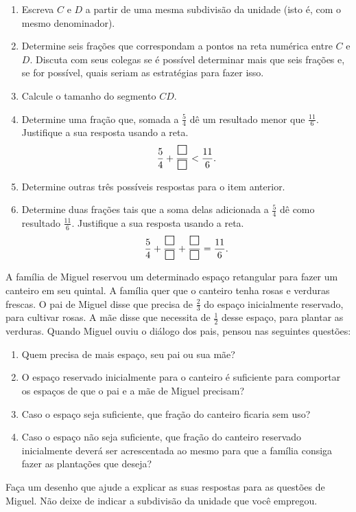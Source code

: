 \begin{atividade}{}
\begin{enumerate} [\quad a)] %
  \item     Escreva $C$ e $D$ a partir de uma mesma subdivisão da unidade (isto é, com o mesmo denominador).
  \item     Determine seis frações que correspondam a pontos na reta numérica entre $C$ e $D$. \newline
  Discuta com seus colegas se é possível determinar mais que seis frações e, se for possível, quais seriam as estratégias para fazer isso.
  \item     Calcule o tamanho do segmento     $CD$.
  \item     Determine uma fração que, somada a     $\frac{5}{4}$     dê um resultado menor que     $\frac{11}{6}$. Justifique a sua resposta usando a reta.     $$ \dfrac{5}{4} +\dfrac{\text{\Large $\square$}}{\text{\Large $\square$}} < \dfrac{11}{6}.$$
  \item     Determine outras três possíveis respostas para o item anterior.
  \item     Determine duas frações tais que a soma delas adicionada a $\frac{5}{4}$ dê como resultado $\frac{11}{6}$.
   Justifique a sua resposta usando a reta.     
   \[ \dfrac{5}{4} +\dfrac{\text{\Large $\square$}}{\text{\Large $\square$}} + \dfrac{\text{\Large $\square$}}{\text{\Large $\square$}} = \dfrac{11}{6}.\]
\end{enumerate} %
\end{atividade}

\begin{atividade}{}

A família de Miguel reservou um determinado espaço retangular para fazer um canteiro em seu quintal. A família quer que o canteiro tenha rosas e verduras frescas. O pai de Miguel disse que precisa de $\frac{2}{3}$ do espaço inicialmente reservado, para cultivar rosas. A mãe disse que necessita de $\frac{1}{2}$ desse espaço, para plantar as verduras. Quando Miguel ouviu o diálogo dos pais, pensou nas seguintes questões:
\begin{enumerate} [\quad a)] %
  \item     Quem precisa de mais espaço, seu pai ou sua mãe?
  \item     O espaço reservado inicialmente para o canteiro é suficiente para comportar os espaços de que o pai e a mãe de Miguel precisam?
  \item     Caso o espaço seja suficiente, que fração do canteiro ficaria sem uso?
  \item     Caso o espaço não seja suficiente, que fração do canteiro reservado inicialmente deverá ser acrescentada ao mesmo para que a família consiga fazer as plantações que deseja?
\end{enumerate} %


Faça um desenho que ajude a explicar as suas respostas para as questões de Miguel. Não deixe de indicar a subdivisão da unidade que você empregou.
\end{atividade}

